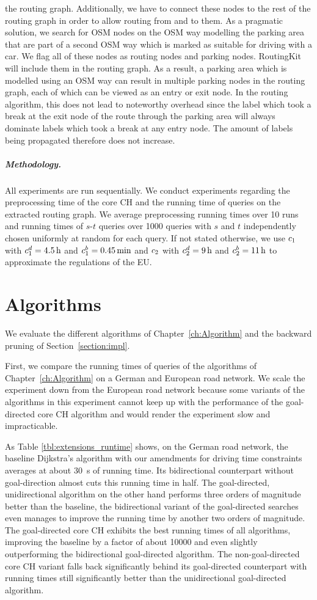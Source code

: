 the routing graph. Additionally, we have to connect these nodes to the rest of the routing graph in order to allow routing from and to them. As a pragmatic solution, we search for OSM nodes on the OSM way modelling the parking area that are part of a second OSM way which is marked as suitable for driving with a car. We flag all of these nodes as routing nodes and parking nodes. RoutingKit will include them in the routing graph. As a result, a parking area which is modelled using an OSM way can result in multiple parking nodes in the routing graph, each of which can be viewed as an entry or exit node. In the routing algorithm, this does not lead to noteworthy overhead since the label which took a break at the exit node of the route through the parking area will always dominate labels which took a break at any entry node. The amount of labels being propagated therefore does not increase.


\subparagraph{Methodology.} All experiments are run sequentially. We conduct experiments regarding the preprocessing time of the core CH and the running time of queries on the extracted routing graph. We average preprocessing running times over \num{10} runs and running times of $s$-$t$ queries over \num{1000} queries with $s$ and $t$ independently chosen uniformly at random for each query. If not stated otherwise, we use $c_1$ with $c_1^d = \SI{4.5}{\hour}$ and $c_1^b = \SI{0.45}{\minute}$ and $c_2$ with $c_2^d = \SI{9}{\hour}$ and $c_2^b = \SI{11}{\hour}$ to approximate the regulations of the EU.

\section{Algorithms}
We evaluate the different algorithms of Chapter~\ref{ch:Algorithm} and the backward pruning of Section~\ref{section:impl}.

First, we compare the running times of queries of the algorithms of Chapter~\ref{ch:Algorithm} on a German and European road network. We scale the experiment down from the European road network because some variants of the algorithms in this experiment cannot keep up with the performance of the goal-directed core CH algorithm and would render the experiment slow and impracticable.

As Table \ref{tbl:extensions_runtime} shows, on the German road network, the baseline Dijkstra's algorithm with our amendments for driving time constraints averages at about \SI{30}{\second} of running time. Its bidirectional counterpart without goal-direction almost cuts this running time in half. The goal-directed, unidirectional algorithm on the other hand performs three orders of magnitude better than the baseline, the bidirectional variant of the goal-directed searches even manages to improve the running time by another two orders of magnitude. The goal-directed core CH exhibits the best running times of all algorithms, improving the baseline by a factor of about \num{10000} and even slightly outperforming the bidirectional goal-directed algorithm. The non-goal-directed core CH variant falls back significantly behind its goal-directed counterpart with running times still significantly better than the unidirectional goal-directed algorithm.

